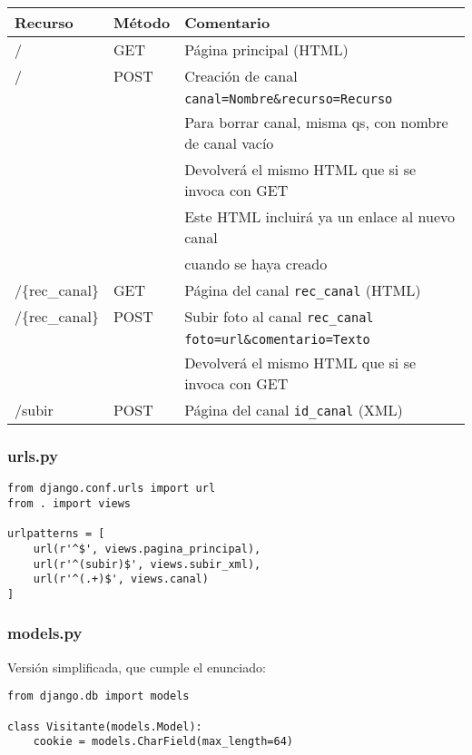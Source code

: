 {\begin{tabular}{|l|l|l|}
  \hline
  Recurso & Método & Comentario \\ \hline \hline
  /       & GET    & Página principal (HTML) \\ \hline
  /       & POST   & Creación de canal \\
          &        & \verb|canal=Nombre&recurso=Recurso| \\
          &        & Para borrar canal, misma qs, con nombre de canal vacío \\
          &        & Devolverá el mismo HTML que si se invoca con GET \\
          &        & Este HTML incluirá ya un enlace al nuevo canal \\
          &        & cuando se haya creado \\ \hline
  /\{rec\_canal\} & GET & Página del canal \verb|rec_canal| (HTML) \\ \hline
  /\{rec\_canal\} & POST & Subir foto al canal \verb|rec_canal| \\
          &        & \verb|foto=url&comentario=Texto| \\
          &        & Devolverá el mismo HTML que si se invoca con GET \\ \hline
  /subir  & POST   & Página del canal \verb|id_canal| (XML) \\ \hline
\end{tabular}

\subsubsection*{urls.py}

\begin{verbatim}
from django.conf.urls import url
from . import views

urlpatterns = [
    url(r'^$', views.pagina_principal),
    url(r'^(subir)$', views.subir_xml),
    url(r'^(.+)$', views.canal)
]
\end{verbatim}

\subsubsection*{models.py}

Versión simplificada, que cumple el enunciado:

\begin{verbatim}
from django.db import models

class Visitante(models.Model):
    cookie = models.CharField(max_length=64)


\end{verbatim}}
